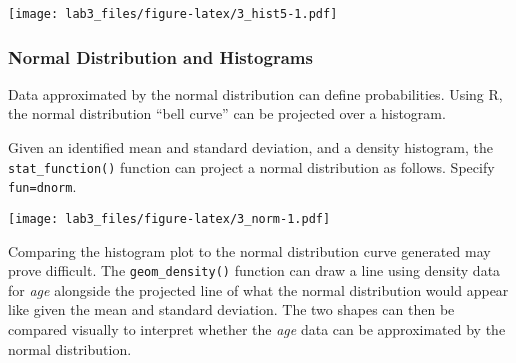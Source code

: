 \documentclass[]{article}
\newenvironment{Shaded}{\begin{snugshade}}{\end{snugshade}}
\newcommand{\KeywordTok}[1]{\textcolor[rgb]{0.13,0.29,0.53}{\textbf{#1}}}
\newcommand{\DataTypeTok}[1]{\textcolor[rgb]{0.13,0.29,0.53}{#1}}
\newcommand{\DecValTok}[1]{\textcolor[rgb]{0.00,0.00,0.81}{#1}}
\newcommand{\StringTok}[1]{\textcolor[rgb]{0.31,0.60,0.02}{#1}}
\newcommand{\OperatorTok}[1]{\textcolor[rgb]{0.81,0.36,0.00}{\textbf{#1}}}
\newcommand{\NormalTok}[1]{#1}
\begin{document}
\texttt{[image: lab3\_files/figure-latex/3\_hist5-1.pdf]}

\subsubsection{Normal Distribution and
Histograms}\label{normal-distribution-and-histograms}

Data approximated by the normal distribution can define probabilities.
Using R, the normal distribution ``bell curve'' can be projected over a
histogram.

Given an identified mean and standard deviation, and a density
histogram, the \texttt{stat\_function()} function can project a normal
distribution as follows. Specify \texttt{fun=dnorm}.

\begin{Shaded}
\end{Shaded}

\texttt{[image: lab3\_files/figure-latex/3\_norm-1.pdf]}

Comparing the histogram plot to the normal distribution curve generated
may prove difficult. The \texttt{geom\_density()} function can draw a
line using density data for \emph{age} alongside the projected line of
what the normal distribution would appear like given the mean and
standard deviation. The two shapes can then be compared visually to
interpret whether the \emph{age} data can be approximated by the normal
distribution.

\begin{Shaded}
\end{Shaded}
\end{document}
